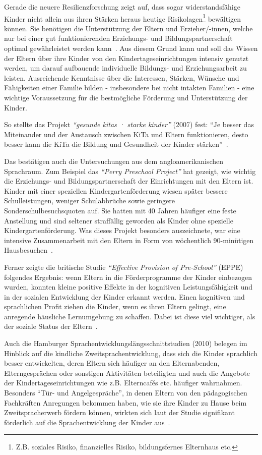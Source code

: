 \documentclass[12pt,a4paper]{article}
\begin{document}
Gerade die neuere Resilienzforschung zeigt auf, dass sogar widerstandsfähige Kinder nicht allein aus ihren Stärken heraus heutige Risikolagen\footnote{Z.B. soziales Risiko, finanzielles Risiko, bildungsfernes Elternhaus etc.} bewältigen können. Sie benötigen die Unterstützung der Eltern und Erzieher/-innen, welche nur bei einer gut funktionierenden Erziehungs- und Bildungspartnerschaft optimal gewährleistet werden kann~\parencite[S.~33]{Aichinger_2011}. Aus diesem Grund kann und soll das Wissen der Eltern über ihre Kinder von den Kindertageseinrichtungen intensiv genutzt werden, um darauf aufbauende individuelle Bildungs- und Erziehungsarbeit zu leisten. Ausreichende Kenntnisse über die Interessen, Stärken, Wünsche und Fähigkeiten einer Familie bilden - insbesondere bei nicht intakten Familien - eine wichtige Voraussetzung für die bestmögliche Förderung und Unterstützung der Kinder.

	So stellte das Projekt \textit{"`gesunde kitas · starke kinder"'} (2007) fest: "`Je besser das Miteinander und der Austausch zwischen KiTa und Eltern funktionieren, desto besser kann die KiTa die Bildung und Gesundheit der Kinder stärken"'~\parencite[S.~50]{PEB}.
	
Das bestätigen auch die Untersuchungen aus dem angloamerikanischen Sprachraum. Zum Beispiel das \textit{"`Perry Preschool Project"'} hat gezeigt, wie wichtig die Erziehungs- und Bildungspartnerschaft der Einrichtungen mit den Eltern ist. Kinder mit einer speziellen Kindergartenförderung wiesen später bessere Schulleistungen, weniger Schulabbrüche sowie geringere Sonderschulbesuchsquoten auf. Sie hatten mit 40 Jahren häufiger eine feste Anstellung und sind seltener straffällig geworden als Kinder ohne spezielle Kindergartenförderung. Was dieses Projekt besonders auszeichnete, war eine intensive Zusammenarbeit mit den Eltern in Form von wöchentlich 90-minütigen Hausbesuchen~\parencite[S.~1-18]{Schweinhart}.

Ferner zeigte die britische Studie \textit{"`Effective Provision of Pre-School"'} (EPPE) folgendes Ergebnis: wenn Eltern in die Förderprogramme der Kinder einbezogen wurden, konnten kleine positive Effekte in der kognitiven Leistungsfähigkeit und in der sozialen Entwicklung der Kinder erkannt werden. Einen kognitiven und sprachlichen Profit ziehen die Kinder, wenn es ihren Eltern gelingt, eine anregende häusliche Lernumgebung zu schaffen. Dabei ist diese viel wichtiger, als der soziale Status der Eltern~\parencite[S.~25]{Sylva_2004}.

	Auch die Hamburger Sprachentwicklungslängsschnittstudien (2010) belegen im Hinblick auf die kindliche Zweitsprachentwicklung, dass sich die Kinder sprachlich besser entwickelten, deren Eltern sich häufiger an den Elternabenden, Elterngesprächen oder sonstigen Aktivitäten beteiligten und auch die Angebote der Kindertageseinrichtungen wie z.B. Elterncafés etc. häufiger wahrnahmen. Besonders "`Tür- und Angelgespräche"', in denen Eltern von den pädagogischen Fachkräften Anregungen bekommen haben, wie sie ihre Kinder zu Hause beim Zweitspracherwerb fördern können, wirkten sich laut der Studie signifikant förderlich auf die Sprachentwicklung der Kinder aus~\parencite[S.~206-209]{Hildenbrand}.
\end{document}
